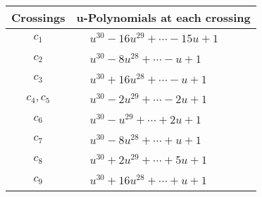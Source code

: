 \documentclass[1p]{elsarticle_modified}
\theoremstyle{definition}
\begin{document}
\begin{tabular}{m{50pt}|m{274pt}}
Crossings & \hspace{64pt}u-Polynomials at each crossing \\
\hline $$\begin{aligned}c_{1}\end{aligned}$$&$\begin{aligned}
&u^{30}-16 u^{29}+\cdots-15 u+1
\end{aligned}$\\
\hline $$\begin{aligned}c_{2}\end{aligned}$$&$\begin{aligned}
&u^{30}-8 u^{28}+\cdots- u+1
\end{aligned}$\\
\hline $$\begin{aligned}c_{3}\end{aligned}$$&$\begin{aligned}
&u^{30}+16 u^{28}+\cdots- u+1
\end{aligned}$\\
\hline $$\begin{aligned}c_{4},c_{5}\end{aligned}$$&$\begin{aligned}
&u^{30}-2 u^{29}+\cdots-2 u+1
\end{aligned}$\\
\hline $$\begin{aligned}c_{6}\end{aligned}$$&$\begin{aligned}
&u^{30}- u^{29}+\cdots+2 u+1
\end{aligned}$\\
\hline $$\begin{aligned}c_{7}\end{aligned}$$&$\begin{aligned}
&u^{30}-8 u^{28}+\cdots+u+1
\end{aligned}$\\
\hline $$\begin{aligned}c_{8}\end{aligned}$$&$\begin{aligned}
&u^{30}+2 u^{29}+\cdots+5 u+1
\end{aligned}$\\
\hline $$\begin{aligned}c_{9}\end{aligned}$$&$\begin{aligned}
&u^{30}+16 u^{28}+\cdots+u+1
\end{aligned}$\\

\end{tabular}
\end{document}

